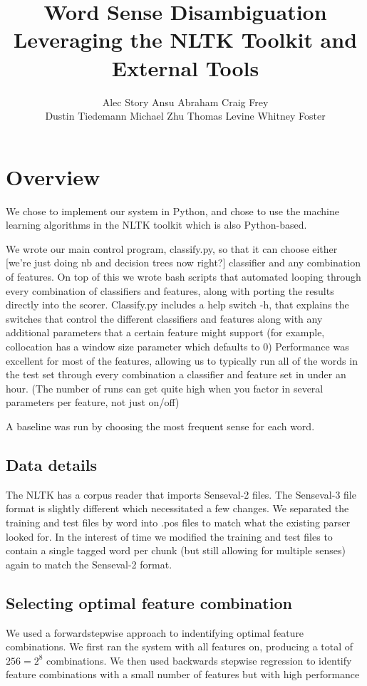\documentclass{article}
\title{Word Sense Disambiguation\\
\small{Leveraging the NLTK Toolkit and External Tools}}
\author{
Alec Story
Ansu Abraham
Craig Frey\\
Dustin Tiedemann
Michael Zhu
Thomas Levine
Whitney Foster\\
}
\begin{document}
\maketitle

\section{Overview}
We  chose to implement our system in Python, and chose to use the machine learning algorithms in the NLTK toolkit which is also Python-based.

We wrote our main control program, classify.py, so that it can choose either [we're just doing nb and decision trees now right?] classifier and any combination of  features. On top of this we wrote bash scripts that automated looping through every combination of classifiers and features, along with porting the results directly into the scorer.
Classify.py includes a help switch -h, that explains the switches that control the different classifiers and features along with any additional parameters that a certain feature might support (for example, collocation has a window size parameter which defaults to 0)
Performance was excellent for most of the features, allowing us to typically run all of the words in the test set through every combination a classifier and feature set in under an hour. (The number of runs can get quite high when you factor in several parameters per feature, not just on/off)

A baseline was run by choosing the most frequent sense for each word.

\subsection{Data details}
The  NLTK has a corpus reader  that imports Senseval-2 files. The Senseval-3  file format is slightly  different which necessitated a few changes. We separated the training  and test files by word into .pos files to match  what the existing  parser looked for. In the interest of time we modified  the training and  test files to contain a single tagged word per chunk  (but still  allowing for multiple senses) again to match the Senseval-2  format.

\subsection{Selecting optimal feature combination}
\newcommand\ward{forward} %
We used a \ward stepwise approach to indentifying optimal feature combinations.
We first ran the system with all features on, producing a total of $256=2^8$ combinations.
We then used backwards stepwise regression to identify feature combinations
with a small number of features but with high performance
\end{document}
